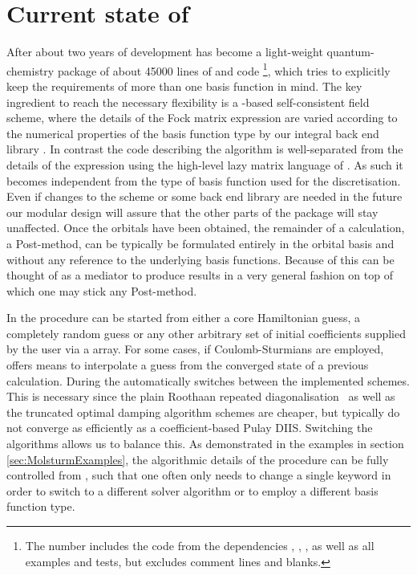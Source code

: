 \section{Current state of \molsturm}
\label{sec:MolsturmState}

After about two years of development
\molsturm has become a light-weight quantum-chemistry package of about 45000
lines of \cpp and \python code%
\footnote{The number includes the code from the dependencies
\gint, \gscf, \lazyten, \krims as well as
all examples and tests, but excludes comment lines and blanks.},
which tries to explicitly keep the requirements of more than
one basis function in mind.
The key ingredient to reach the necessary flexibility
is a \contraction-based self-consistent field scheme,
where the details of the Fock matrix \contraction expression
are varied according to the numerical properties of the basis function type
by our integral back end library \gint.
In contrast the code describing the \SCF algorithm
is well-separated from the details of the \contraction expression
using the high-level lazy matrix language of \lazyten.
As such it becomes independent from the type of basis function used for the discretisation.
Even if changes to the \SCF scheme or some back end
library are needed in the future our modular design
will assure that the other parts of the \molsturm package will stay unaffected.
Once the \SCF orbitals have been obtained,
the remainder of a calculation, \eg a Post-\HF method,
can be typically be formulated entirely in the \SCF orbital basis
and without any reference to the underlying basis functions.
Because of this \molsturm can be thought of as a mediator
to produce \SCF results in a very general fashion
on top of which one may stick any Post-\HF method.

In \molsturm the \SCF procedure can be started from either a core Hamiltonian guess,
a completely random guess or any other arbitrary set of initial
coefficients supplied by the user via a \numpy array.
For some cases, \eg if Coulomb-Sturmians are employed,
\molsturm offers means to interpolate a guess
from the converged state of a previous calculation.
During the \SCF \molsturm automatically switches between
the implemented \SCF schemes.
This is necessary since the plain Roothaan
repeated diagonalisation~\cite{Roothaan1951}
as well as the truncated optimal damping algorithm schemes
are cheaper, but typically do not converge as efficiently
as a coefficient-based Pulay DIIS.
Switching the algorithms allows us to balance this.
As demonstrated in the examples in section \ref{sec:MolsturmExamples},
the algorithmic details of the \SCF procedure can be fully controlled
from \python,
such that one often only needs to change a single keyword
in order to switch to a different solver algorithm
or to employ a different basis function type.


